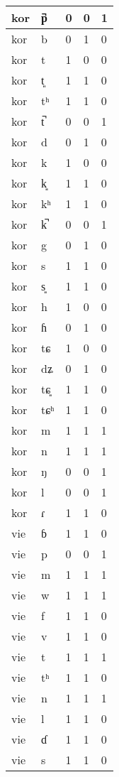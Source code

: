 \begin{longtable}{ | l | l | l | l | l | }
	kor & p̚ & 0 & 0 & 1 \\ \hline
	kor & b & 0 & 1 & 0 \\ \hline
	kor & t & 1 & 0 & 0 \\ \hline
	kor & t͈ & 1 & 1 & 0 \\ \hline
	kor & tʰ & 1 & 1 & 0 \\ \hline
	kor & t̚ & 0 & 0 & 1 \\ \hline
	kor & d & 0 & 1 & 0 \\ \hline
	kor & k & 1 & 0 & 0 \\ \hline
	kor & k͈ & 1 & 1 & 0 \\ \hline
	kor & kʰ & 1 & 1 & 0 \\ \hline
	kor & k̚ & 0 & 0 & 1 \\ \hline
	kor & g & 0 & 1 & 0 \\ \hline
	kor & s & 1 & 1 & 0 \\ \hline
	kor & s͈ & 1 & 1 & 0 \\ \hline
	kor & h & 1 & 0 & 0 \\ \hline
	kor & ɦ & 0 & 1 & 0 \\ \hline
	kor & tɕ & 1 & 0 & 0 \\ \hline
	kor & dʑ & 0 & 1 & 0 \\ \hline
	kor & tɕ͈ & 1 & 1 & 0 \\ \hline
	kor & tɕʰ & 1 & 1 & 0 \\ \hline
	kor & m & 1 & 1 & 1 \\ \hline
	kor & n & 1 & 1 & 1 \\ \hline
	kor & ŋ & 0 & 0 & 1 \\ \hline
	kor & l & 0 & 0 & 1 \\ \hline
	kor & ɾ & 1 & 1 & 0 \\ \hline
	vie & ɓ & 1 & 1 & 0 \\ \hline
	vie & p & 0 & 0 & 1 \\ \hline
	vie & m & 1 & 1 & 1 \\ \hline
	vie & w & 1 & 1 & 1 \\ \hline
	vie & f & 1 & 1 & 0 \\ \hline
	vie & v & 1 & 1 & 0 \\ \hline
	vie & t & 1 & 1 & 1 \\ \hline
	vie & tʰ & 1 & 1 & 0 \\ \hline
	vie & n & 1 & 1 & 1 \\ \hline
	vie & l & 1 & 1 & 0 \\ \hline
	vie & ɗ & 1 & 1 & 0 \\ \hline
	vie & s & 1 & 1 & 0 \\ \hline

\end{longtable}
